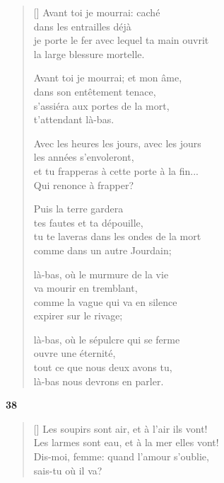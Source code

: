 \documentclass[a4paper,12pt]{book}
\begin{document}
\begin{verse}[\versewidth]
  Avant toi je mourrai: caché \\
  dans les entrailles déjà \\
  je porte le fer avec lequel ta main ouvrit \\
  la large blessure mortelle.

  Avant toi je mourrai; et mon âme, \\
  dans son entêtement tenace, \\
  s'assiéra aux portes de la mort, \\
  t'attendant là-bas.

  Avec les heures les jours, avec les jours \\
  les années s'envoleront, \\
  et tu frapperas à cette porte à la fin... \\
  Qui renonce à frapper?

  Puis la terre gardera \\
  tes fautes et ta dépouille, \\
  tu te laveras dans les ondes de la mort \\
  comme dans un autre Jourdain;

  là-bas, où le murmure de la vie \\
  va mourir en tremblant, \\
  comme la vague qui va en silence \\
  expirer sur le rivage;

  là-bas, où le sépulcre qui se ferme \\
  ouvre une éternité, \\
  tout ce que nous deux avons tu, \\
  là-bas nous devrons en parler.
\end{verse}

\bigskip

\begin{center}
  \textbf{38}
\end{center}

\settowidth{\versewidth}{je porte le fer avec lequel ta main ouvrit}

\begin{verse}[\versewidth]
  Les soupirs sont air, et à l'air ils vont! \\
  Les larmes sont eau, et à la mer elles vont! \\
  Dis-moi, femme: quand l'amour s'oublie, \\
  sais-tu où il va?
\end{verse}
\end{document}

